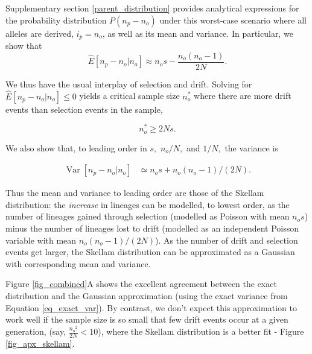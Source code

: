 \documentclass[review,nonatbib]{elsarticle}
\begin{document}
Supplementary section \ref{parent_distribution} provides analytical expressions for the probability distribution
$P(n_p-n_o) $ under this worst-case scenario where all alleles are derived, $i_p= n_o$, as well as its
mean and variance. In particular, we show that
\begin{equation}
    \label{eq_lineages_approx}
    \hat{E}[n_p-n_o | n_o] \approx n_o  s - \frac{n_o (n_o-1) }{2N}.
\end{equation}

We thus have the usual interplay of selection and drift. Solving for $ \hat{E}[n_p -n_o | n_o]\leq0$
yields a critical sample size $n^*_o$ where there are more drift events than selection events in
the sample,

\begin{equation}
  \label{eq_critical_sample}
  n_o^* \ge 2N s.
\end{equation}

We also show that, to leading order in $s,$ $n_o/N,$ and $1/N,$ the variance is

\begin{equation}
  \begin{aligned}
    \operatorname{Var}[n_p-n_o | n_o] &\simeq
   n_o  s +   n_o (n_o-1)/(2 N).
    \label{eq_gauss_var}
  \end{aligned}
\end{equation}

Thus the mean and variance to leading order are those of the Skellam distribution: the
\textit{increase} in lineages can be modelled, to lowest order, as the number of lineages gained
through selection (modelled as Poisson with mean  $ n_o s$) minus the number of lineages lost to
drift (modelled as an independent Poisson variable with mean  $ n_o (n_o-1)/(2 N)$).
As the number of drift and selection events get larger, the Skellam distribution can be approximated as a
Gaussian with corresponding mean and variance.


Figure \ref{fig_combined}A shows the excellent agreement between the exact distribution and the
Gaussian approximation (using the exact variance from Equation \ref{eq_exact_var}). By contrast,
we don't expect this approximation to work well if the sample size is so small that few drift
events occur at a given generation, (say, $\frac{{n_o}^2}{2N} < 10$), where the Skellam
distribution is a better fit - Figure \ref{fig_apx_skellam}.
\end{document}
